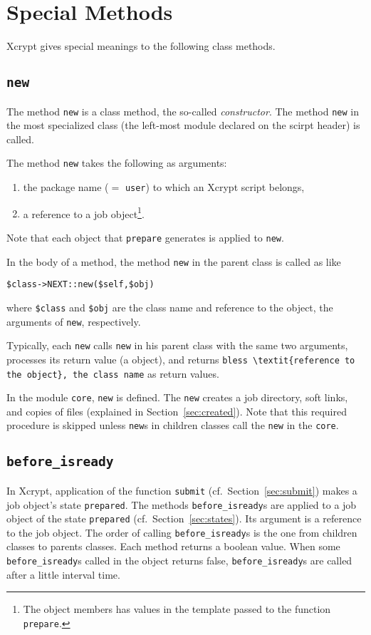 \documentclass[a4paper,10pt]{report}
\def\|{\verb|} %|
\begin{document}
\section{Special Methods}

Xcrypt gives special meanings to the following class methods.

\subsection{\texttt{new}}

The method \texttt{new} is a class method, the so-called
\textit{constructor}.  The method \|new| in the most specialized class
(the left-most module declared on the scirpt header) is called.

The method \|new| takes the following as arguments:
\begin{enumerate}
\item the package name ($=$ \|user|) to which an Xcrypt script belongs,
\item a reference to a job object\footnote{The object members has
      values in the template passed to the function \texttt{prepare}.}.
\end{enumerate}
Note that each object that \|prepare| generates is applied to \|new|.

In the body of a method, the method \|new| in the parent class is
called as like
\begin{center}
 \|$class->NEXT::new($self,$obj)|
\end{center}
where \|$class| and \|$obj| are the class name and reference to the
object, the arguments of \|new|, respectively.

Typically, each \|new| calls \|new| in his parent class with the same
two arguments, processes its return value (a object), and returns
\|bless \textit{reference to the object}, the class name| as return values.

In the module \|core|, \|new| is defined.  The \|new| creates a job
directory, soft links, and copies of files (explained in
Section~\ref{sec:created}).  Note that this required procedure is
skipped unless \|new|s in children classes call the \|new| in the
\|core|.

\subsection{\texttt{before\_isready}}

In Xcrypt, application of the function \|submit| (cf.\
Section~\ref{sec:submit}) makes a job object's state \|prepared|.  The
methods \texttt{before\_isready}s are applied to a job object of the
state \|prepared| (cf.\ Section~\ref{sec:states}).  Its argument is a
reference to the job object.  The order of calling
\texttt{before\_isready}s is the one from children classes to parents
classes.  Each method returns a boolean value.  When some
\texttt{before\_isready}s called in the object returns false,
\texttt{before\_isready}s are called after a little interval time.
\end{document}
